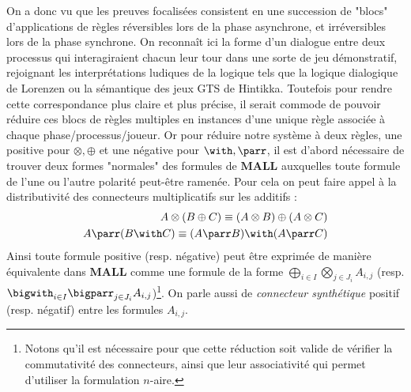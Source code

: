 \documentclass[11pt]{report}
\begin{document}
On a donc vu que les preuves focalisées consistent en une succession de "blocs" d'applications de règles réversibles lors de la phase asynchrone, et irréversibles lors de la phase synchrone. On reconnaît ici la forme d'un dialogue entre deux processus qui interagiraient chacun leur tour dans une sorte de jeu démonstratif, rejoignant les interprétations ludiques de la logique tels que la logique dialogique de Lorenzen ou la sémantique des jeux GTS de Hintikka. Toutefois pour rendre cette correspondance plus claire et plus précise, il serait commode de pouvoir réduire ces blocs de règles multiples en instances d'une unique règle associée à chaque phase/processus/joueur. Or pour réduire notre système à deux règles, une positive pour $\otimes,\oplus$ et une négative pour $\with,\parr$, il est d'abord nécessaire de trouver deux formes "normales" des formules de $\mathbf{MALL}$ auxquelles toute formule de l'une ou l'autre polarité peut-être ramenée. Pour cela on peut faire appel à la distributivité des connecteurs multiplicatifs sur les additifs :
\begin{align}
A \otimes (B \oplus C) \equiv (A \otimes B) \oplus (A \otimes C) \label{eq:dist_pos} \\
A \parr (B \with C) \equiv (A \parr B) \with (A \parr C) \label{eq:dist_neg}
\end{align}
Ainsi toute formule positive (resp. négative) peut être exprimée de manière équivalente dans $\mathbf{MALL}$ comme une formule de la forme $\bigoplus_{i \in I}\bigotimes_{j \in J_i}A_{i,j}$ (resp. $\bigwith_{i \in I}\bigparr_{j \in J_i}A_{i,j}$)\footnote{Notons qu'il est nécessaire pour que cette réduction soit valide de vérifier la commutativité des connecteurs, ainsi que leur associativité qui permet d'utiliser la formulation $n$-aire.}. On parle aussi de \emph{connecteur synthétique} positif (resp. négatif) entre les formules $A_{i,j}$.\\
\end{document}
